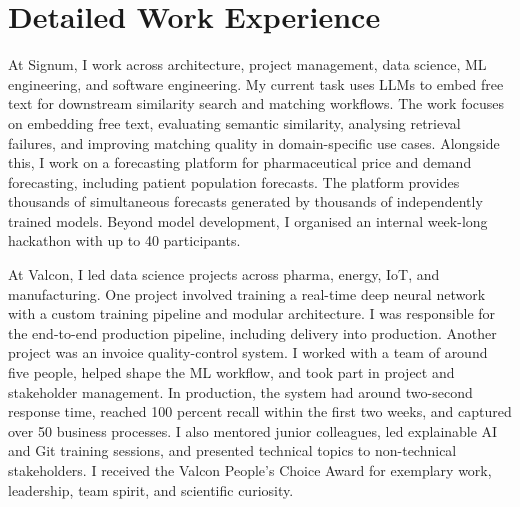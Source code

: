 \documentclass[11pt,a4paper]{moderncv}
\begin{document}
\newpage

\section{Detailed Work Experience}

\label{sec:signum}
 {
    At Signum, I work across architecture, project management, data science, ML engineering, and software engineering.
    \newline\hspace*{2em}
    My current task uses LLMs to embed free text for downstream similarity search and matching workflows. The work focuses on embedding free text, evaluating semantic similarity, analysing retrieval failures, and improving matching quality in domain-specific use cases.
    \newline\hspace*{2em}
    Alongside this, I work on a forecasting platform for pharmaceutical price and demand forecasting, including patient population forecasts. The platform provides thousands of simultaneous forecasts generated by thousands of independently trained models.
    \newline\hspace*{2em}
    Beyond model development, I organised an internal week-long hackathon with up to 40 participants.
}{}

\label{sec:valcon}
 {
    At Valcon, I led data science projects across pharma, energy, IoT, and manufacturing.
    \newline\hspace*{2em}
    One project involved training a real-time deep neural network with a custom training pipeline and modular architecture. I was responsible for the end-to-end production pipeline, including delivery into production.
    \newline\hspace*{2em}
    Another project was an invoice quality-control system. I worked with a team of around five people, helped shape the ML workflow, and took part in project and stakeholder management. In production, the system had around two-second response time, reached 100 percent recall within the first two weeks, and captured over 50 business processes.
    \newline\hspace*{2em}
    I also mentored junior colleagues, led explainable AI and Git training sessions, and presented technical topics to non-technical stakeholders. I received the Valcon People's Choice Award for exemplary work, leadership, team spirit, and scientific curiosity.
}{}
\end{document}
